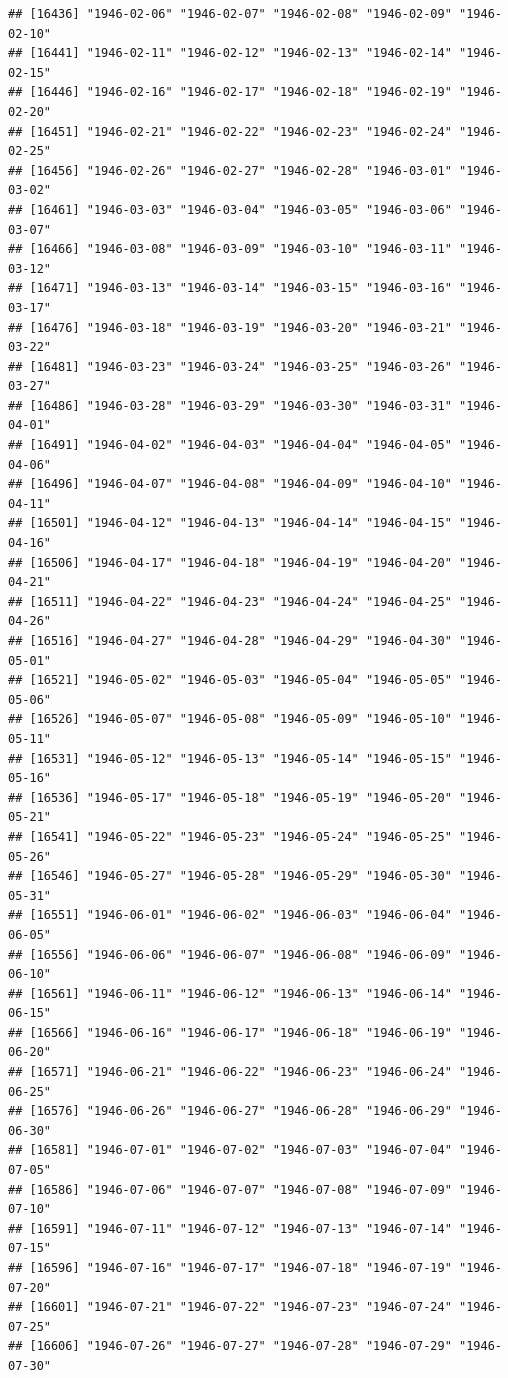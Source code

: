 \documentclass{article}\usepackage[]{graphicx}\usepackage[]{color}
\makeatletter
\newenvironment{kframe}{%
 \def\at@end@of@kframe{}%
 \ifinner\ifhmode%
  \def\at@end@of@kframe{\end{minipage}}%
  \begin{minipage}{\columnwidth}%
 \fi\fi%
 \def\FrameCommand##1{\hskip\@totalleftmargin \hskip-\fboxsep
 \colorbox{shadecolor}{##1}\hskip-\fboxsep
     \hskip-\linewidth \hskip-\@totalleftmargin \hskip\columnwidth}%
 \MakeFramed {\advance\hsize-\width
   \@totalleftmargin\z@ \linewidth\hsize
   \@setminipage}}%
 {\par\unskip\endMakeFramed%
 \at@end@of@kframe}
\newenvironment{knitrout}{}{} %
\makeatother
\begin{document}
\begin{description}
\begin{knitrout}
\begin{kframe}
\begin{verbatim}
## [16436] "1946-02-06" "1946-02-07" "1946-02-08" "1946-02-09" "1946-02-10"
## [16441] "1946-02-11" "1946-02-12" "1946-02-13" "1946-02-14" "1946-02-15"
## [16446] "1946-02-16" "1946-02-17" "1946-02-18" "1946-02-19" "1946-02-20"
## [16451] "1946-02-21" "1946-02-22" "1946-02-23" "1946-02-24" "1946-02-25"
## [16456] "1946-02-26" "1946-02-27" "1946-02-28" "1946-03-01" "1946-03-02"
## [16461] "1946-03-03" "1946-03-04" "1946-03-05" "1946-03-06" "1946-03-07"
## [16466] "1946-03-08" "1946-03-09" "1946-03-10" "1946-03-11" "1946-03-12"
## [16471] "1946-03-13" "1946-03-14" "1946-03-15" "1946-03-16" "1946-03-17"
## [16476] "1946-03-18" "1946-03-19" "1946-03-20" "1946-03-21" "1946-03-22"
## [16481] "1946-03-23" "1946-03-24" "1946-03-25" "1946-03-26" "1946-03-27"
## [16486] "1946-03-28" "1946-03-29" "1946-03-30" "1946-03-31" "1946-04-01"
## [16491] "1946-04-02" "1946-04-03" "1946-04-04" "1946-04-05" "1946-04-06"
## [16496] "1946-04-07" "1946-04-08" "1946-04-09" "1946-04-10" "1946-04-11"
## [16501] "1946-04-12" "1946-04-13" "1946-04-14" "1946-04-15" "1946-04-16"
## [16506] "1946-04-17" "1946-04-18" "1946-04-19" "1946-04-20" "1946-04-21"
## [16511] "1946-04-22" "1946-04-23" "1946-04-24" "1946-04-25" "1946-04-26"
## [16516] "1946-04-27" "1946-04-28" "1946-04-29" "1946-04-30" "1946-05-01"
## [16521] "1946-05-02" "1946-05-03" "1946-05-04" "1946-05-05" "1946-05-06"
## [16526] "1946-05-07" "1946-05-08" "1946-05-09" "1946-05-10" "1946-05-11"
## [16531] "1946-05-12" "1946-05-13" "1946-05-14" "1946-05-15" "1946-05-16"
## [16536] "1946-05-17" "1946-05-18" "1946-05-19" "1946-05-20" "1946-05-21"
## [16541] "1946-05-22" "1946-05-23" "1946-05-24" "1946-05-25" "1946-05-26"
## [16546] "1946-05-27" "1946-05-28" "1946-05-29" "1946-05-30" "1946-05-31"
## [16551] "1946-06-01" "1946-06-02" "1946-06-03" "1946-06-04" "1946-06-05"
## [16556] "1946-06-06" "1946-06-07" "1946-06-08" "1946-06-09" "1946-06-10"
## [16561] "1946-06-11" "1946-06-12" "1946-06-13" "1946-06-14" "1946-06-15"
## [16566] "1946-06-16" "1946-06-17" "1946-06-18" "1946-06-19" "1946-06-20"
## [16571] "1946-06-21" "1946-06-22" "1946-06-23" "1946-06-24" "1946-06-25"
## [16576] "1946-06-26" "1946-06-27" "1946-06-28" "1946-06-29" "1946-06-30"
## [16581] "1946-07-01" "1946-07-02" "1946-07-03" "1946-07-04" "1946-07-05"
## [16586] "1946-07-06" "1946-07-07" "1946-07-08" "1946-07-09" "1946-07-10"
## [16591] "1946-07-11" "1946-07-12" "1946-07-13" "1946-07-14" "1946-07-15"
## [16596] "1946-07-16" "1946-07-17" "1946-07-18" "1946-07-19" "1946-07-20"
## [16601] "1946-07-21" "1946-07-22" "1946-07-23" "1946-07-24" "1946-07-25"
## [16606] "1946-07-26" "1946-07-27" "1946-07-28" "1946-07-29" "1946-07-30"

\end{verbatim}
\end{kframe}
\end{knitrout}
\end{description}
\end{document}
